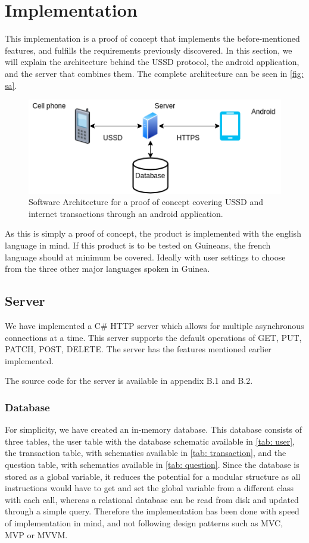 \documentclass[11pt, a4paper]{article}
\begin{document}

\section{Implementation}
This implementation is a proof of concept that implements the before-mentioned features, and fulfills the requirements previously discovered. In this section, we will explain the architecture behind the USSD protocol, the android application, and the server that combines them. The complete architecture can be seen in \autoref{fig: sa}.

\begin{figure}[ht]
\centering
\includegraphics[width=1\linewidth]{figs/SA2.png}
\caption{Software Architecture for a proof of concept covering USSD and internet transactions through an android application.}
\label{fig: sa}
\end{figure}

As this is simply a proof of concept, the product is implemented with the english language in mind. If this product is to be tested on Guineans, the french language should at minimum be covered. Ideally with user settings to choose from the three other major languages spoken in Guinea.
\subsection{Server} %
We have implemented a C\# HTTP server which allows for multiple asynchronous connections at a time. This server supports the default operations of GET, PUT, PATCH, POST, DELETE. The server has the features mentioned earlier implemented.

The source code for the server is available in appendix B.1 and B.2.

\subsubsection{Database}
For simplicity, we have created an in-memory database. This database consists of three tables, the user table with the database schematic available in \autoref{tab: user}, the transaction table, with schematics available in \autoref{tab: transaction}, and the question table, with schematics available in \autoref{tab: question}. Since the database is stored as a global variable, it reduces the potential for a modular structure as all instructions would have to get and set the global variable from a different class with each call, whereas a relational database can be read from disk and updated through a simple query. Therefore the implementation has been done with speed of implementation in mind, and not following design patterns such as MVC, MVP or MVVM.
\end{document}
